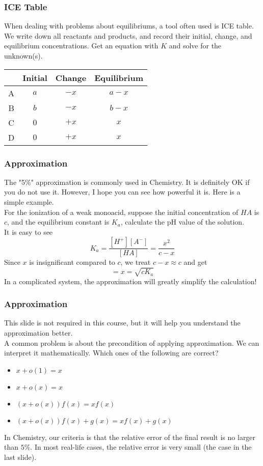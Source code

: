 \documentclass[aspectratio=169]{beamer}
\def\blankline{\\[12pt]}
\begin{document}
\begin{frame}
  \frametitle{ICE Table}
  When dealing with problems about equilibriums, a tool often used is ICE table.
  \blankline
  We write down all reactants and products, and record their initial, change, and equilibrium concentrations. 
  Get an equation with $K$ and solve for the unknown(s).
  \begin{table}[h]
    \centering
    \begin{tabular}{|c|c|c|c|}
      \hline
      & Initial & Change & Equilibrium \\
      \hline
      A & $a$ & $-x$ & $a-x$ \\
      \hline
      B & $b$ & $-x$ & $b-x$ \\
      \hline
      C & $0$ & $+x$ & $x$ \\
      \hline
      D & $0$ & $+x$ & $x$ \\
      \hline
    \end{tabular}
  \end{table}
\end{frame}
\begin{frame}
  \frametitle{Approximation}
  The "5\%" approximation is commonly used in Chemistry. It is definitely OK if you do not use it. However, I hope 
  you can see how powerful it is. Here is a simple example.
  \blankline
  For the ionization of a weak monoacid, suppose the initial concentration of $HA$ is $c$, and the equilibrium constant is $K_a$, 
  calculate the pH value of the solution.
  \pause
  \blankline
  It is easy to see
  \begin{equation*}
    K_a = \frac{[H^+][A^-]}{[HA]} = \frac{x^2}{c-x}
  \end{equation*}
  Since $x$ is insignificant compared to $c$, we treat $c-x\approx c$ and get
  \begin{equation*}
    [H^+] = x = \sqrt{cK_a}
  \end{equation*}
  In a complicated system, the approximation will greatly simplify the calculation!
\end{frame}
\begin{frame}
  \frametitle{Approximation}
  This slide is not required in this course, but it will help you understand the approximation better.
  \blankline
  A common problem is about the precondition of applying approximation. We can interpret it 
  mathematically. Which ones of the following are correct?
  \begin{itemize}
    \item $x + o(1) = x$
    \item $x + o(x) = x$
    \item $(x + o(x))f(x) = xf(x)$
    \item $(x + o(x))f(x) + g(x) = xf(x) + g(x)$
  \end{itemize}
  In Chemistry, our criteria is that the relative error of the final result is no larger than $5\%$. 
  In most real-life cases, the relative error is very small (the case in the last slide).
\end{frame}
\end{document}
